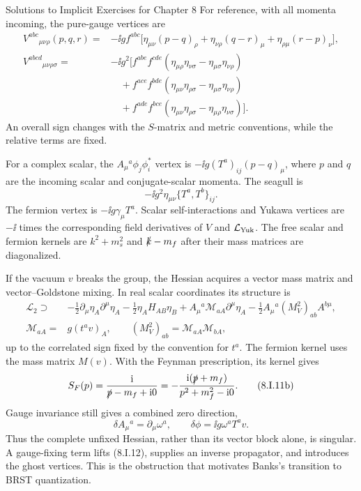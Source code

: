 \begin{bankssolutions}{Solutions to Implicit Exercises for Chapter 8}
For reference, with all momenta incoming, the pure-gauge vertices are
\begin{align*}
 V^{abc}{}_{\mu\nu\rho}(p,q,r)
 ={}&-\ii g f^{abc}\bigl[
 \eta_{\mu\nu}(p-q)_\rho+
 \eta_{\nu\rho}(q-r)_\mu+
 \eta_{\rho\mu}(r-p)_\nu\bigr],\\
 V^{abcd}{}_{\mu\nu\rho\sigma}
 ={}&-\ii g^2\bigl[
 f^{abe}f^{cde}(\eta_{\mu\rho}\eta_{\nu\sigma}
                 -\eta_{\mu\sigma}\eta_{\nu\rho})\\
 &\quad+f^{ace}f^{bde}(\eta_{\mu\nu}\eta_{\rho\sigma}
                 -\eta_{\mu\sigma}\eta_{\nu\rho})\\
 &\quad+f^{ade}f^{bce}(\eta_{\mu\nu}\eta_{\rho\sigma}
                 -\eta_{\mu\rho}\eta_{\nu\sigma})\bigr].
 \tag{8.I.10}
\end{align*}
An overall sign changes with the $S$-matrix and metric conventions, while the
relative terms are fixed.

For a complex scalar, the $A_\mu{}^a\phi_j\phi_i^*$ vertex is
$-\ii g(T^a)_{ij}(p-q)_\mu$, where $p$ and $q$ are the incoming scalar and
conjugate-scalar momenta.  The seagull is
\[
 -\ii g^2\eta_{\mu\nu}\{T^a,T^b\}_{ij}.
 \tag{8.I.11}
\]
The fermion vertex is $-\ii g\gamma_\mu T^a$.  Scalar self-interactions and
Yukawa vertices are $-\ii$ times the corresponding field derivatives of
$V$ and $\mathcal L_{\rm Yuk}$.  The free scalar and fermion kernels are
$k^2+m_s^2$ and $\slashed k-m_f$ after their mass matrices are diagonalized.

If the vacuum $v$ breaks the group, the Hessian acquires a vector mass matrix
and vector--Goldstone mixing.  In real scalar coordinates its structure is
\begin{align*}
 \mathcal L_2\supset{}&-\frac12\partial_\mu\eta_A\partial^\mu\eta_A
 -\frac12\eta_A H_{AB}\eta_B
 +A_\mu{}^a\mathcal M_{aA}\partial^\mu\eta_A
 -\frac12A_\mu{}^a(M_V^2)_{ab}A^{b\mu},\\
 \mathcal M_{aA}={}&g(t^av)_A,\qquad
 (M_V^2)_{ab}=\mathcal M_{aA}\mathcal M_{bA},
 \tag{8.I.11a}
\end{align*}
up to the correlated sign fixed by the convention for $t^a$.  The fermion
kernel uses the mass matrix $M(v)$.  With the Feynman prescription, its kernel
gives
\[
 S_F(p)=\frac{\mathrm{i}}{\slashed p-m_f+\mathrm{i}0}
 =-\frac{\mathrm{i}(\slashed p+m_f)}{p^2+m_f^2-\mathrm{i}0}.
 \tag{8.I.11b}
\]
Gauge invariance still gives a combined
zero direction,
\[
 \delta A_\mu{}^a=\partial_\mu\omega^a,
 \qquad \delta\phi=\ii g\omega^aT^av.
 \tag{8.I.12}
\]
Thus the complete unfixed Hessian, rather than its vector block alone, is
singular.  A gauge-fixing term lifts (8.I.12), supplies an inverse propagator,
and introduces the ghost vertices.  This is the obstruction that motivates
Banks's transition to BRST quantization.


\end{bankssolutions}
